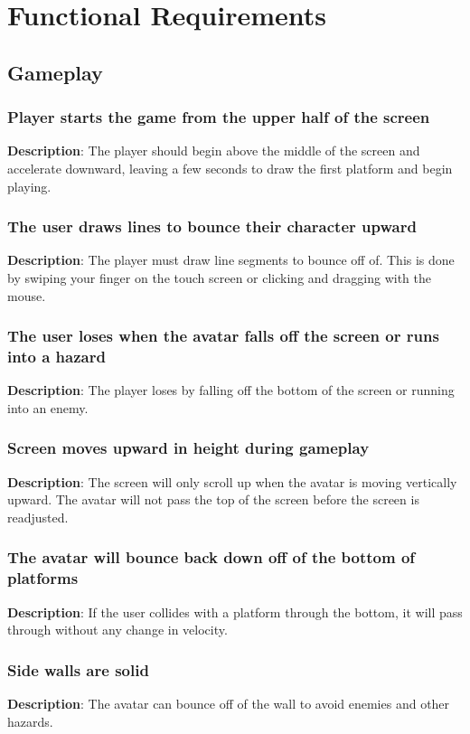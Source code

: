 \chapter{Functional Requirements}
\section{Gameplay}
\renewcommand{\thesubsection}{GAME-%
\ifnum\value{subsection}<10 0\fi
\arabic{subsection}}
\subsection{Player starts the game from the upper half of the screen}
\textbf{Description}: The player should begin above the middle of the screen and accelerate
downward, leaving a few seconds to draw the first platform and begin
playing.

\subsection{The user draws lines to bounce their character upward}
\textbf{Description}: The player must draw line segments to bounce
off of. This is done by swiping your finger on the touch screen or
clicking and dragging with the mouse.

\subsection{The user loses when the avatar falls off the screen or runs
into a hazard}
\textbf{Description}: The player loses by falling off the bottom of
the screen or running into an enemy.

\subsection{Screen moves upward in height during gameplay}
\textbf{Description}: The screen will only scroll up when the avatar
is moving vertically upward. The avatar will not pass the top of the
screen before the screen is readjusted.

\subsection{The avatar will bounce back down off of the bottom of platforms}
\textbf{Description}: If the user collides with a platform through
the bottom, it will pass through without any change in velocity.

\subsection{Side walls are solid}
\textbf{Description}: The avatar can bounce off of the wall to avoid enemies and other hazards.

